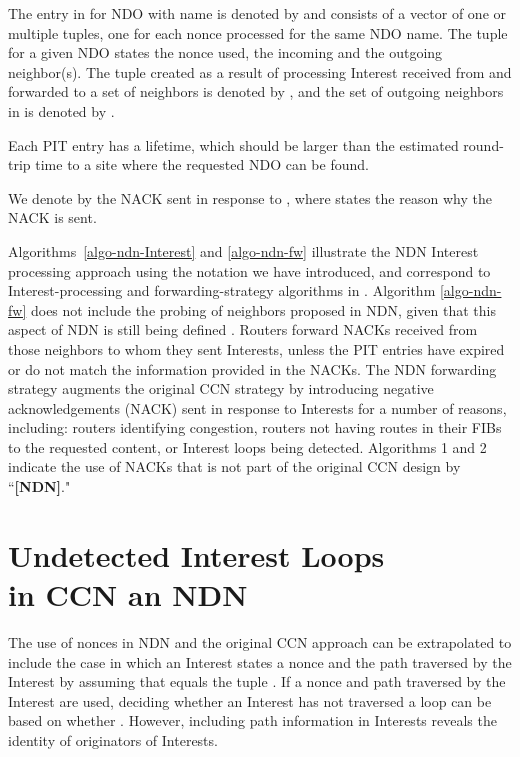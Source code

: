 \documentclass{ancs15-alternate}
\begin{document}
The entry in  for NDO with name  is denoted by  and consists of a vector of one or multiple tuples, one for each nonce processed for the same NDO name.
The tuple for a given NDO  states the nonce used, the incoming and the outgoing neighbor(s). The tuple created as a result of processing Interest  received from  and forwarded to a set of neighbors   is denoted by  
, and the set of outgoing neighbors 
in  is denoted by .

Each PIT entry  has a lifetime,
which should be larger than the estimated round-trip time to a site where the requested NDO can be found.

We denote by  the NACK sent in response to  , where  states the reason why the NACK is sent. 

Algorithms~\ref{algo-ndn-Interest}  and \ref{algo-ndn-fw} illustrate the NDN Interest processing  approach \cite{ndn-fw, ndn-fw2} using the notation we have introduced, and  correspond to Interest-processing and forwarding-strategy algorithms in \cite{ndn-fw2}. Algorithm \ref{algo-ndn-fw} does not include the probing of neighbors proposed in NDN, given that this aspect of  NDN is  still being defined \cite{ndn-fw2}. Routers forward NACKs received from those neighbors to whom they sent Interests, unless the PIT entries have expired or do not match the information provided in the NACKs. 
The NDN forwarding strategy augments  the original CCN strategy by  introducing  negative acknowledgements (NACK) sent in 
response to Interests for a number of reasons, including:  routers identifying
congestion, routers not having routes in their FIBs to the requested content, or Interest loops being detected.
Algorithms 1 and 2 indicate the use of NACKs that is not  part of the original CCN design by ``{\bf [NDN]}."


\section{Undetected Interest Loops \\ in CCN an NDN  }
\label{sec-loop}

 The use of nonces in NDN and the original CCN approach can be extrapolated  to include the case in which 
an Interest states a nonce and the path traversed by the Interest by assuming that  equals the tuple  .
If a nonce and path traversed by the Interest are used, deciding whether an Interest has not traversed a loop can be based on whether . However, including path information in Interests reveals the identity of originators of Interests.
\end{document}
